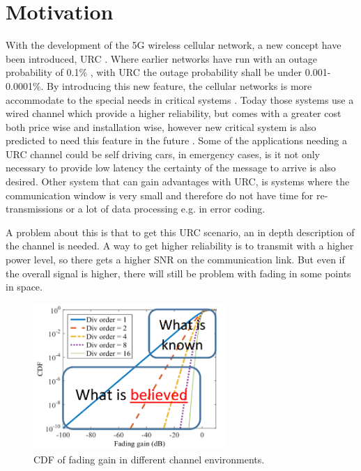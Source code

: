 \section{Motivation}
With the development of the 5G wireless cellular network, a new concept have been introduced, \gls{URC} \citep{Petar5G}. Where earlier networks have run with an outage probability of 0.1\% , with URC the outage probability shall be under 0.001-0.0001\%. By introducing this new feature, the cellular networks is more accommodate to the special needs in critical systems . Today those systems use a wired channel which provide a higher reliability, but comes with a greater cost both price wise and installation wise, however new critical system is also predicted to need this feature in the future . %
Some of the applications needing a URC channel could be self driving cars, in emergency cases, is it not only necessary to provide low latency the certainty of the message to arrive is also desired. %
Other system that can gain advantages with URC, is systems where the communication window is very small and therefore do not have time for re-transmissions or a lot of data processing e.g. in error coding.


A problem about this is that to get this URC scenario, an in depth description of the channel is needed. A way to get higher reliability is to transmit with a higher power level, so there gets a higher \gls{SNR} on the communication link. But even if the overall signal is higher, there will still be problem with fading in some points in space. 


\begin{figure}[H]
\centering
\includegraphics[width=0.65\textwidth]{figures/fading_gain.png}
\caption{\Gls{CDF} of fading gain in different channel environments.}
\label{fading_gain}
\end{figure}


